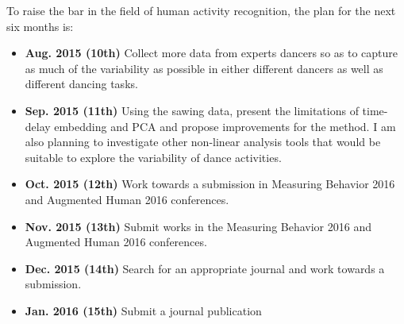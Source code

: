 \documentclass[10pt,journal,compsoc]{IEEEtran}
\begin{document}

To raise the bar in the field of human activity recognition,
the plan for the next six months is:
% 

\begin{itemize}
 \item \textbf{Aug. 2015 (10th)} Collect more data from experts dancers so as to 
capture as much of the variability as possible in either different
dancers as well as different dancing tasks.
\item \textbf{Sep. 2015 (11th)}  Using the sawing data, present the limitations of 
    time-delay embedding and PCA and propose improvements for the method.
    I am also planning to investigate other non-linear analysis tools that would be suitable 
	to explore the variability of dance activities.
 \item \textbf{Oct. 2015 (12th)} Work towards a submission in Measuring Behavior 2016 and Augmented Human 2016 conferences.
 \item \textbf{Nov. 2015 (13th)} Submit works in the Measuring Behavior 2016 and Augmented Human 2016 conferences.
 \item \textbf{Dec. 2015 (14th)} Search for an appropriate journal and work towards a submission.
 \item \textbf{Jan. 2016 (15th)} Submit a journal publication
\end{itemize}












% 
% 
\end{document}
